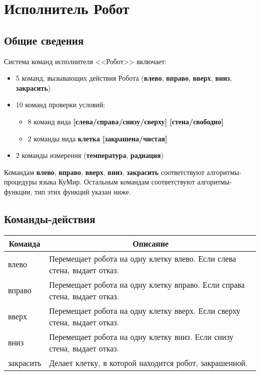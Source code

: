 \documentclass[12pt,a4paper]{article}
\begin{document}
\section{Исполнитель Робот}

\subsection{Общие сведения}

Система команд исполнителя <<Робот>> включает:
\begin{itemize}
\item 5 команд, вызывающих действия Робота (\textbf{влево}, \textbf{вправо}, \textbf{вверх}, \textbf{вниз}, \textbf{закрасить})
\item 10 команд проверки условий:
	\begin{itemize}
	\item 8 команд вида \textbf{[слева/справа/снизу/сверху] [стена/свободно]}
	\item 2 команды вида \textbf{клетка [закрашена/чистая]}
	\end{itemize}
\item 2 команды измерения (\textbf{температура}, \textbf{радиация})
\end{itemize}

Командам  \textbf{влево}, \textbf{вправо}, \textbf{вверх}, \textbf{вниз}, \textbf{закрасить} соответствуют ал\-го\-рит\-мы-про\-це\-ду\-ры языка КуМир. Остальным командам соответствуют алгоритмы-функции, тип этих функций указан ниже.

\subsection{Команды-действия}

\begin{center}
\begin{tabular}{||p{2.5cm}|p{12cm}||}
\hline
\hline
\multicolumn{1}{||c|}{\bfseries Команда} & \multicolumn{1}{|c||}{\bfseries Описание}\\
\hline
	влево &
	Перемещает робота на одну клетку влево. Если слева стена, выдает отказ.\\
	вправо &
	Перемещает робота на одну клетку вправо. Если справа стена, выдает отказ.\\
 	вверх &
	Перемещает робота на одну клетку вверх. Если сверху стена, выдает отказ.\\
	вниз &
	Перемещает робота на одну клетку вниз. Если снизу стена, выдает отказ.\\
	закрасить &
	Делает клетку, в которой находится робот, закрашенной.\\
\hline
\hline
\end{tabular}
\end{center}
\end{document}

